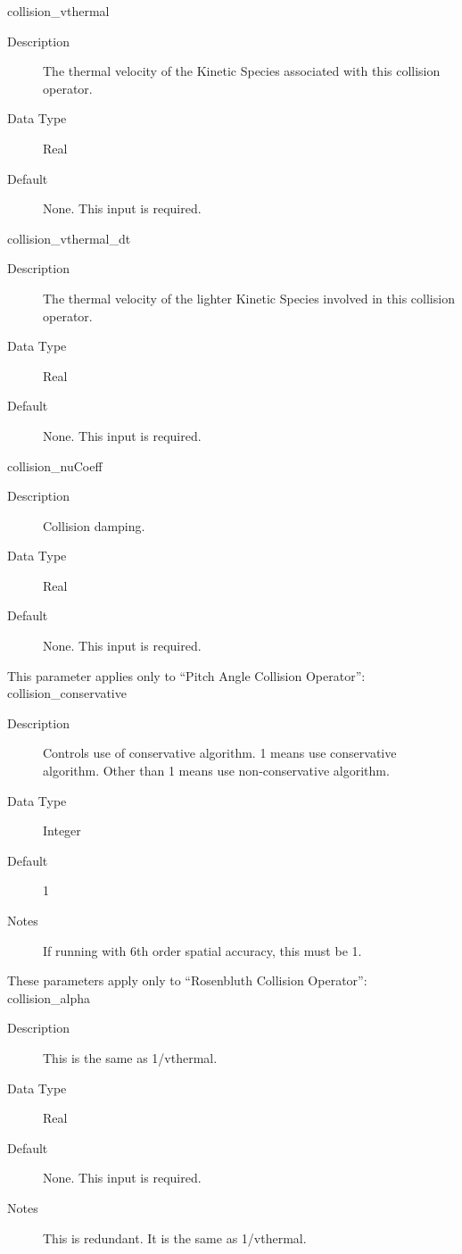 \documentclass[11pt]{amsart}
\begin{document}
collision\_vthermal
\begin{description}
\item [Description] The thermal velocity of the Kinetic Species associated with
this collision operator.
\item [Data Type] Real
\item [Default] None.  This input is required.
\end{description}

collision\_vthermal\_dt
\begin{description}
\item [Description] The thermal velocity of the lighter Kinetic Species
involved in this collision operator.
\item [Data Type] Real
\item [Default] None.  This input is required.
\end{description}

collision\_nuCoeff
\begin{description}
\item [Description] Collision damping.
\item [Data Type] Real
\item [Default] None.  This input is required.
\end{description}

This parameter applies only to ``Pitch Angle Collision Operator'': \\
\indent collision\_conservative
\begin{description}
\item [Description] Controls use of conservative algorithm.  1 means use
conservative algorithm.  Other than 1 means use non-conservative algorithm.
\item [Data Type] Integer
\item [Default] 1
\item [Notes] If running with 6th order spatial accuracy, this must be 1.
\end{description}

These parameters apply only to ``Rosenbluth Collision Operator'': \\
\indent collision\_alpha
\begin{description}
\item [Description] This is the same as 1/vthermal.
\item [Data Type] Real
\item [Default] None.  This input is required.
\item [Notes] This is redundant.  It is the same as 1/vthermal.
\end{description}
\end{document}

